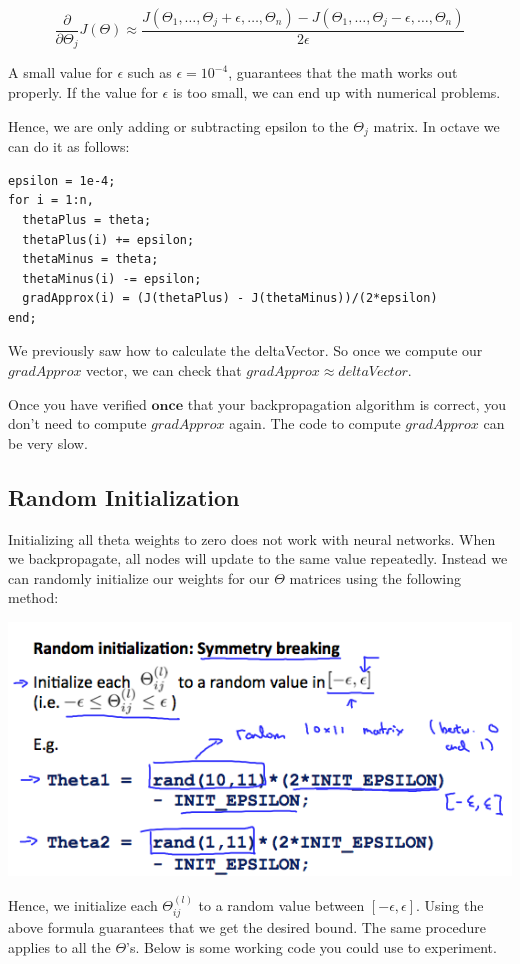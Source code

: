 \documentclass[UTF8]{article}
\begin{document}
\[\dfrac{\partial}{\partial\Theta_j}J(\Theta) \approx \dfrac{J(\Theta_1, \dots, \Theta_j + \epsilon, \dots, \Theta_n) - J(\Theta_1, \dots, \Theta_j - \epsilon, \dots, \Theta_n)}{2\epsilon}\]

A small value for $\epsilon$ such as $\epsilon = 10^{-4}$, guarantees that the math works out properly. If the value for $\epsilon$ is too small, we can end up with numerical problems.

Hence, we are only adding or subtracting epsilon to the $\Theta_j$ matrix. In octave we can do it as follows:

\begin{lstlisting}
epsilon = 1e-4;
for i = 1:n,
  thetaPlus = theta;
  thetaPlus(i) += epsilon;
  thetaMinus = theta;
  thetaMinus(i) -= epsilon;
  gradApprox(i) = (J(thetaPlus) - J(thetaMinus))/(2*epsilon)
end;
\end{lstlisting}

We previously saw how to calculate the deltaVector. So once we compute our $gradApprox$ vector, we can check that $gradApprox \approx deltaVector$.

Once you have verified $\textbf{once}$ that your backpropagation algorithm is correct, you don't need to compute $gradApprox$ again. The code to compute $gradApprox$ can be very slow.

\subsection{Random Initialization}

Initializing all theta weights to zero does not work with neural networks. When we backpropagate, all nodes will update to the same value repeatedly. Instead we can randomly initialize our weights for our $\Theta$ matrices using the following method:

\includegraphics[width = .8\textwidth]{NotePics/9_6_1.png}

Hence, we initialize each $\Theta^{(l)}_{ij}$ to a random value between $[-\epsilon,\epsilon]$. Using the above formula guarantees that we get the desired bound. The same procedure applies to all the $\Theta$'s. Below is some working code you could use to experiment.
\end{document}
